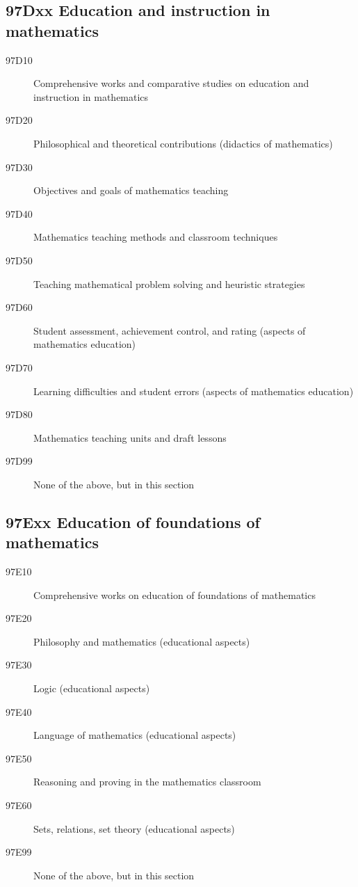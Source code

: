 \subsection*{97Dxx  Education and instruction in mathematics }\label{97Dxx}
\begin{description}  
\item [97D10]\label{97D10} Comprehensive works and comparative studies on education and instruction in mathematics
\item [97D20]\label{97D20} Philosophical and theoretical contributions (didactics of mathematics) 
\item [97D30]\label{97D30} Objectives and goals of mathematics teaching
\item [97D40]\label{97D40} Mathematics teaching methods and classroom techniques 
\item [97D50]\label{97D50} Teaching mathematical problem solving and heuristic strategies
\item [97D60]\label{97D60} Student assessment, achievement control, and rating (aspects of mathematics education)
\item [97D70]\label{97D70} Learning difficulties and student errors (aspects of mathematics education)
\item [97D80]\label{97D80} Mathematics teaching units and draft lessons
\item [97D99]\label{97D99} None of the above, but in this section
\end{description}
\subsection*{97Exx Education of foundations of mathematics }\label{97Exx}
\begin{description}  
\item [97E10]\label{97E10} Comprehensive works on education of foundations of mathematics
\item [97E20]\label{97E20} Philosophy and mathematics (educational aspects)
\item [97E30]\label{97E30} Logic (educational aspects)
\item [97E40]\label{97E40} Language of mathematics (educational aspects)
\item [97E50]\label{97E50} Reasoning and proving in the mathematics classroom
\item [97E60]\label{97E60} Sets, relations, set theory (educational aspects)
\item [97E99]\label{97E99} None of the above, but in this section
\end{description}

